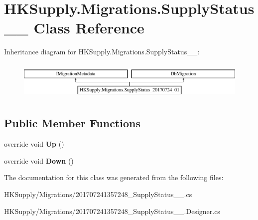 \hypertarget{class_h_k_supply_1_1_migrations_1_1_supply_status__20170724__01}{}\section{H\+K\+Supply.\+Migrations.\+Supply\+Status\+\_\+\_ Class Reference}
\label{class_h_k_supply_1_1_migrations_1_1_supply_status__20170724__01}
Inheritance diagram for H\+K\+Supply.\+Migrations.\+Supply\+Status\+\_\+\_\+:\begin{figure}[H]
\begin{center}
\leavevmode
\includegraphics[height=1.866667cm]{class_h_k_supply_1_1_migrations_1_1_supply_status__20170724__01}
\end{center}
\end{figure}
\subsection*{Public Member Functions}
\begin{DoxyCompactItemize}
\item 
\mbox{\label{class_h_k_supply_1_1_migrations_1_1_supply_status__20170724__01_acfa0a8159590f9e4cbba771e81f40120}} 
override void {\bfseries Up} ()
\item 
\mbox{\label{class_h_k_supply_1_1_migrations_1_1_supply_status__20170724__01_a8c1ba9236cc1dc5b469f3d79c739f858}} 
override void {\bfseries Down} ()
\end{DoxyCompactItemize}


The documentation for this class was generated from the following files\+:\begin{DoxyCompactItemize}
\item 
H\+K\+Supply/\+Migrations/201707241357248\+\_\+\+Supply\+Status\+\_\+\_.\+cs\item 
H\+K\+Supply/\+Migrations/201707241357248\+\_\+\+Supply\+Status\+\_\+\_.\+Designer.\+cs\end{DoxyCompactItemize}
